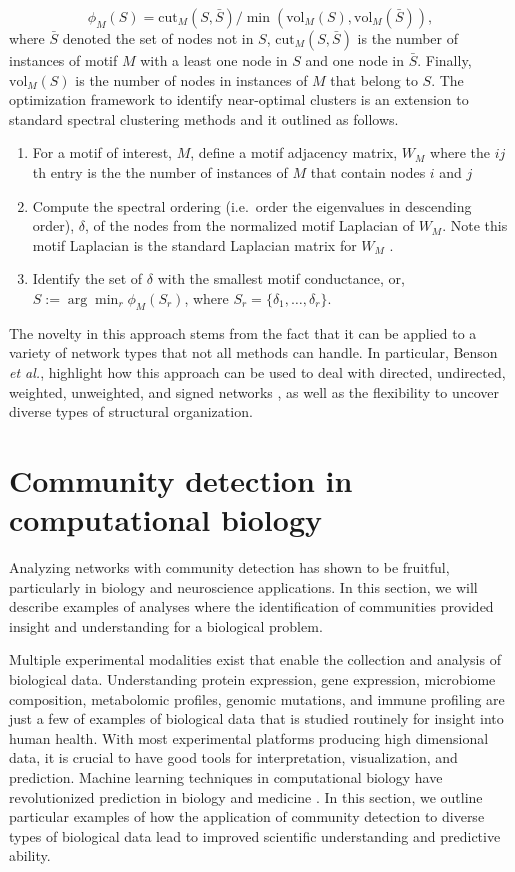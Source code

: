 \begin{equation}
\phi_{M}(S)=\text{cut}_{M}(S,\bar{S})/\min(\text{vol}_{M}(S),\text{vol}_{M}(\bar{S})),
\end{equation}
where $\bar{S}$ denoted the set of nodes not in $S$, $\text{cut}_{M}(S,\bar{S})$ is the number of instances of motif $M$ with a least one node in $S$ and one node in $\bar{S}$. Finally, $\text{vol}_{M}(S)$ is the number of nodes in instances of $M$ that belong to $S$. The optimization framework to identify near-optimal clusters is an extension to standard spectral clustering methods and it outlined as follows. 
\begin{enumerate}
\item For a motif of interest, $M$, define a motif adjacency matrix, $W_{M}$ where the $ij$th entry is the the number of instances of $M$ that contain nodes $i$ and $j$
\item Compute the spectral ordering (i.e.~order the eigenvalues in descending order), $\delta$, of the nodes from the normalized motif Laplacian of $W_{M}$. Note this motif Laplacian is the standard Laplacian matrix for $W_{M}$ \cite{laplacian}. 
\item Identify the set of $\delta$ with the smallest motif conductance, or, $S := \arg \min_{r} \phi_{M}(S_{r})$, where $S_{r}=\{\delta_{1}, \dots, \delta_{r}\}$. 
\end{enumerate}

The novelty in this approach stems from the fact that it can be applied to a variety of network types that not all methods can handle. In particular, Benson \emph{et al.}, highlight how this approach can be used to deal with directed, undirected, weighted, unweighted, and signed networks \cite{benson2}, as well as the flexibility to uncover diverse types of structural organization. 

\section{Community detection in computational biology}
Analyzing networks with community detection has shown to be fruitful, particularly in biology and neuroscience applications. In this section, we will describe examples of analyses where the identification of communities provided insight and understanding for a biological problem. 

Multiple experimental modalities exist that enable the collection and analysis of biological data. Understanding protein expression, gene expression, microbiome composition, metabolomic profiles, genomic mutations, and immune profiling are just a few of examples of biological data that is studied routinely for insight into human health. With most experimental platforms producing high dimensional data, it is crucial to have good tools for interpretation, visualization, and prediction. Machine learning techniques in computational biology have revolutionized prediction in biology and medicine \cite{systemsImmuno,deepGenome,machineGenomics}. In this section, we outline particular examples of how the application of community detection to diverse types of biological data lead to improved scientific understanding and predictive ability.

